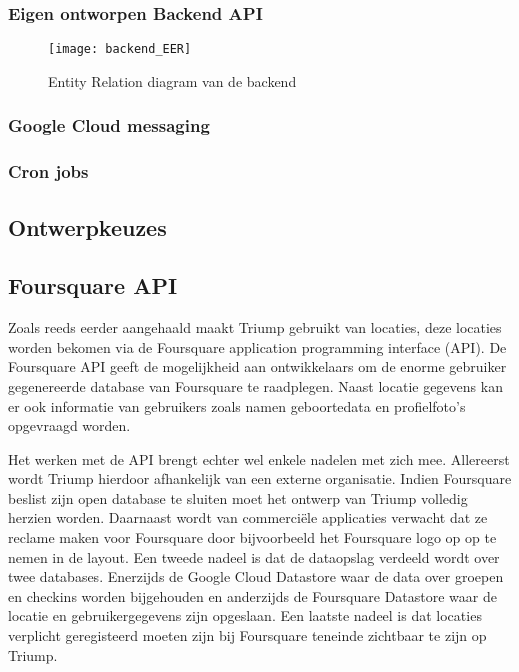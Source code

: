 \subsubsection{Eigen ontworpen Backend API}

\begin{figure}[H]
	\texttt{[image: backend\_EER]}
	\caption{Entity Relation diagram van de backend}
	\label{fig:Backend ER}
\end{figure}

\subsubsection{Google Cloud messaging}

\subsubsection{Cron jobs}
\subsection{Ontwerpkeuzes}



\subsection{Foursquare API}

Zoals reeds eerder aangehaald maakt Triump gebruikt van locaties, deze locaties worden bekomen via de Foursquare application programming interface (API). De Foursquare API geeft de mogelijkheid aan ontwikkelaars om de enorme gebruiker gegenereerde database van Foursquare te raadplegen. Naast locatie gegevens kan er ook informatie van gebruikers zoals namen geboortedata en profielfoto's opgevraagd worden. 

Het werken met de API brengt echter wel enkele nadelen met zich mee.
Allereerst wordt Triump hierdoor afhankelijk van een externe organisatie. Indien Foursquare beslist zijn open database te sluiten moet het ontwerp van Triump volledig herzien worden. Daarnaast wordt van commerciële applicaties verwacht dat ze reclame maken voor Foursquare door bijvoorbeeld het Foursquare logo op op te nemen in de layout.  Een tweede nadeel is dat de dataopslag verdeeld wordt over twee databases. Enerzijds de Google Cloud Datastore waar de data over groepen en checkins worden bijgehouden en anderzijds de Foursquare Datastore waar de locatie en gebruikergegevens zijn opgeslaan. Een laatste nadeel is dat locaties verplicht geregisteerd moeten zijn bij Foursquare teneinde zichtbaar te zijn op Triump. 

